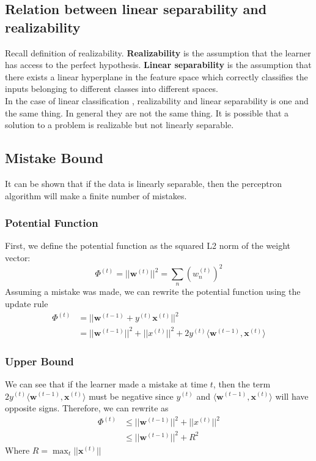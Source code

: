 \documentclass[11pt]{article}
\begin{document}
\subsection{Relation between linear separability and realizability}
Recall definition of realizability.  \textbf{Realizability} is the assumption that the learner has access to the perfect hypothesis. \textbf{Linear separability} is the assumption that there exists a linear hyperplane in the feature space which correctly classifies the inputs belonging to different classes into different spaces. \\
In the case of linear classification , realizability and linear separability is one and the same thing. In general they are not the same thing. It is possible that a solution to a problem is realizable but not linearly separable.

\subsection{Mistake Bound}
It can be shown that if the data is linearly separable, then the perceptron algorithm will make a finite number of mistakes.\\
\subsubsection{Potential Function}
First, we define the potential function as the squared L2 norm of the weight vector:
$$\Phi^{(t)} = ||\mathbf{w}^{(t)}||^2 = \sum_n (w_n^{(t)})^2$$
Assuming a mistake was made, we can rewrite the potential function using the update rule
\begin{align*}
    \Phi^{(t)} &= ||\mathbf{w}^{(t-1)}+y^{(t)} \mathbf{x}^{(t)}||^2\\
    &=||\mathbf{w}^{(t-1)}||^2 + ||x^{(t)}||^2 + 2y^{(t)}\langle \mathbf{w}^{(t-1)}, \mathbf{x}^{(t)} \rangle
\end{align*}

\subsubsection{Upper Bound}
We can see that if the learner made a mistake at time $t$, then the term $2y^{(t)}\langle \mathbf{w}^{(t-1)}, \mathbf{x}^{(t)}\rangle$ must be negative since $y^{(t)}$ and $\langle \mathbf{w}^{(t-1)}, \mathbf{x}^{(t)}\rangle$ will have opposite signs. Therefore, we can rewrite as
\begin{align*}
    \Phi^{(t)} &\leq ||\mathbf{w}^{(t-1)}||^2 + ||x^{(t)}||^2\\
    &\leq ||\mathbf{w}^{(t-1)}||^2 + R^2
\end{align*}
Where $R = \max_{t} ||\mathbf{x}^{(t)}||$
\end{document}

